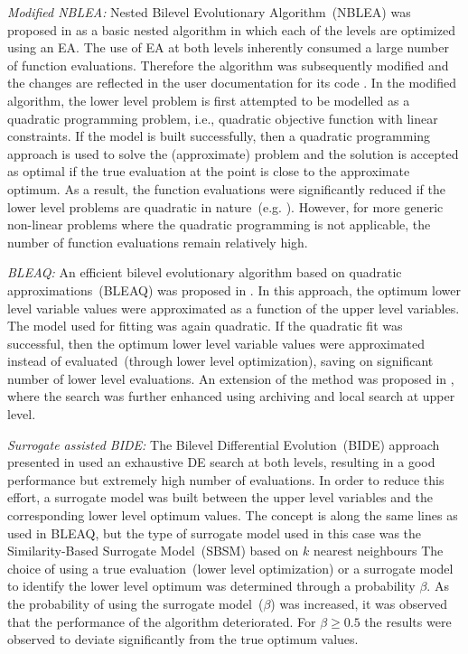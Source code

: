 \noindent\textit{Modified NBLEA:} Nested Bilevel Evolutionary Algorithm~(NBLEA) was proposed in \cite{sinha2014test} as a basic nested algorithm in which each of the levels are optimized using an EA. The use of EA at both levels inherently consumed a large number of function evaluations. Therefore the algorithm was subsequently modified and the changes are reflected in the user documentation for its code \cite{sinha2014bilevel}. In the modified algorithm, the lower level problem is first attempted to be modelled as a quadratic programming problem, i.e., quadratic objective function with linear constraints. If the model is built successfully, then a quadratic programming approach is used to solve the (approximate) problem and the solution is accepted as optimal if the true evaluation at the point is close to the approximate optimum. As a result, the function evaluations were significantly reduced if the lower level problems are quadratic in nature~(e.g. \cite{Angelo2013}). However, for more generic non-linear problems where the quadratic programming is not applicable, the number of function evaluations remain relatively high.

\noindent\textit{BLEAQ:} An efficient bilevel evolutionary algorithm based on quadratic approximations~(BLEAQ) was proposed in \cite{sinha2013efficient}. In this approach, the optimum lower level variable values were approximated as a function of the upper level variables. The model used for fitting was again quadratic. If the quadratic fit was successful, then the optimum lower level variable values were approximated instead of evaluated~(through lower level optimization), saving on significant number of lower level evaluations. An extension of the method was proposed in \cite{sinha_improved_2014}, where the search was further enhanced using archiving and local search at upper level.

\noindent\textit{Surrogate assisted BIDE:} The Bilevel Differential Evolution~(BIDE) approach presented in \cite{Angelo2013} used an exhaustive DE search at both levels, resulting in a good performance but extremely high number of evaluations. In order to reduce this effort, a surrogate model was built between the upper level variables and the corresponding lower level optimum values. The concept is along the same lines as used in BLEAQ, but the type of surrogate model used in this case was the Similarity-Based Surrogate Model~(SBSM) based on $k$ nearest neighbours The choice of using a true evaluation~(lower level optimization) or a surrogate model to identify the lower level optimum was determined through a probability $\beta$. As the probability of using the surrogate model~($\beta$) was increased, it was observed that the performance of the algorithm deteriorated. For $\beta\geq 0.5$ the results were observed to deviate significantly from the true optimum values. 



